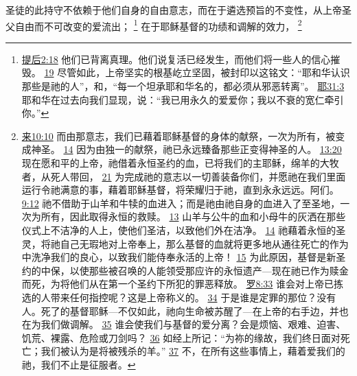 \documentclass[12pt, a4paper, oneside]{ctexart}
\newcounter{parnum}[section]
\newcommand{\N}{%
   \noindent\refstepcounter{parnum}%
    \makebox[\parindent][l]{\textbf{\arabic{parnum}.}}}
\begin{document}
\N 圣徒的此持守不依赖于他们自身的自由意志，而在于遴选预旨的不变性，从上帝圣父自由而不可改变的爱流出；
	\footnote {
		\href{https://biblehub.com/2_timothy/2-18.htm}{提后2:18} 他们已背离真理。他们说复活已经发生，而他们将一些人的信心摧毁。
		\href{https://biblehub.com/2_timothy/2-19.htm}{19} 尽管如此，上帝坚实的根基屹立坚固，被封印以这铭文：“耶和华认识那些是祂的人”，和，“每一个坦承耶和华名的，都必须从邪恶转离”。
		\href{https://biblehub.com/jeremiah/31-3.htm}{耶31:3} 耶和华在过去向我们显现，说：“我已用永久的爱爱你；我以不衰的宽仁牵引你。”
	}
	在于耶稣基督的功绩和调解的效力，
	\footnote {
		\href{https://biblehub.com/hebrews/10-10.htm}{来10:10} 而由那意志，我们已藉着耶稣基督的身体的献祭，一次为所有，被变成神圣。
		\href{https://biblehub.com/hebrews/10-14.htm}{14} 因为由独一的献祭，祂已永远臻备那些正变得神圣的人。
		\href{https://biblehub.com/hebrews/13-20.htm}{13:20} 现在愿和平的上帝，祂借着永恒圣约的血，已将我们的主耶稣，绵羊的大牧者，从死人带回，
		\href{https://biblehub.com/hebrews/13-21.htm}{21} 为完成祂的意志以一切善装备你们，并愿祂在我们里面运行令祂满意的事，藉着耶稣基督，将荣耀归于祂，直到永永远远。阿们。
		\href{https://biblehub.com/hebrews/9-12.htm}{9:12} 祂不借助于山羊和牛犊的血进入；而是祂由祂自身的血进入了至圣地，一次为所有，因此取得永恒的救赎。
		\href{https://biblehub.com/hebrews/9-13.htm}{13} 山羊与公牛的血和小母牛的灰洒在那些仪式上不洁净的人上，使他们圣洁，以致他们外在洁净。
		\href{https://biblehub.com/hebrews/9-14.htm}{14} 祂藉着永恒的圣灵，将祂自己无瑕地对上帝奉上，那么基督的血就将更多地从通往死亡的作为中洗净我们的良心，以致我们能侍奉永活的上帝！
		\href{https://biblehub.com/hebrews/9-15.htm}{15} 为此原因，基督是新圣约的中保，以使那些被召唤的人能领受那应许的永恒遗产---现在祂已作为赎金而死，为将他们从在第一个圣约下所犯的罪恶释放。
		\href{https://biblehub.com/romans/8-33.htm}{罗8:33} 谁会对上帝已拣选的人带来任何指控呢？这是上帝称义的。
		\href{https://biblehub.com/romans/8-34.htm}{34} 于是谁是定罪的那位？没有人。死了的基督耶稣---不仅如此，祂向生命被苏醒了---在上帝的右手边，并也在为我们做调解。
		\href{https://biblehub.com/romans/8-35.htm}{35} 谁会使我们与基督的爱分离？会是烦恼、艰难、迫害、饥荒、裸露、危险或刀剑吗？
		\href{https://biblehub.com/romans/8-36.htm}{36} 如经上所记：“为祢的缘故，我们终日面对死亡；我们被认为是将被残杀的羊。”
		\href{https://biblehub.com/romans/8-37.htm}{37} 不，在所有这些事情上，藉着爱我们的祂，我们不止是征服者。
}
\end{document}
